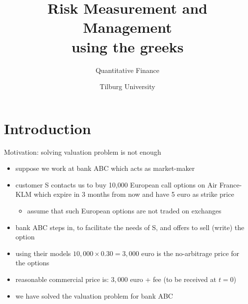 \documentclass[pdf, handout]{beamer}
\title{Risk Measurement and Management \\
using the greeks}
\subtitle{Quantitative Finance}
\author{Tilburg University}
\institute{Ramon van den Akker}
\date{}
\begin{document}
\begin{frame}
\titlepage
\end{frame}
%


\section{Introduction}
%
\begin{frame}{Motivation: solving valuation problem is not enough}
\begin{itemize}
\item suppose we work at bank ABC which acts
as market-maker 
\item customer S contacts us to buy 10,000 European call options
on Air France-KLM which expire in 3 months from now and have 
5 euro as strike price
\begin{itemize}
\item assume that such European options are not traded on exchanges
\end{itemize}
\item bank ABC steps in, to facilitate the needs of S, and offers to sell (write) the option
\item using their models $10,000\times 0.30 = 3,000$ euro is the no-arbitrage price for the options
\item reasonable commercial price is: $3,000$ euro + fee 
(to be received at $t=0$)
\item we have solved the valuation problem for bank ABC
\end{itemize}
\end{frame}
\end{document}
